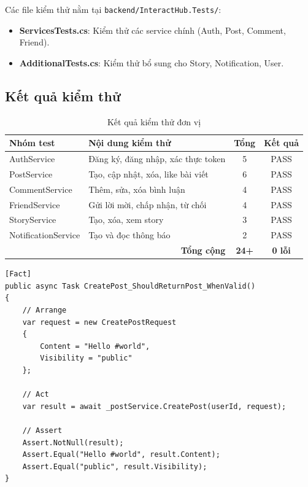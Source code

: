 \documentclass[a4paper]{article}
\begin{document}
Các file kiểm thử nằm tại \texttt{backend/InteractHub.Tests/}:

\begin{itemize}
    \item \textbf{ServicesTests.cs}: Kiểm thử các service chính (Auth, Post, Comment, Friend).
    \item \textbf{AdditionalTests.cs}: Kiểm thử bổ sung cho Story, Notification, User.
\end{itemize}

\subsection{Kết quả kiểm thử}

\begin{table}[h!]
\centering
\caption{Kết quả kiểm thử đơn vị}
\begin{tabularx}{\textwidth}{|l|X|c|c|}
\hline
\textbf{Nhóm test} & \textbf{Nội dung kiểm thử} & \textbf{Tổng} & \textbf{Kết quả} \\
\hline
AuthService & Đăng ký, đăng nhập, xác thực token & 5 & \textcolor{dkgreen}{PASS} \\
\hline
PostService & Tạo, cập nhật, xóa, like bài viết & 6 & \textcolor{dkgreen}{PASS} \\
\hline
CommentService & Thêm, sửa, xóa bình luận & 4 & \textcolor{dkgreen}{PASS} \\
\hline
FriendService & Gửi lời mời, chấp nhận, từ chối & 4 & \textcolor{dkgreen}{PASS} \\
\hline
StoryService & Tạo, xóa, xem story & 3 & \textcolor{dkgreen}{PASS} \\
\hline
NotificationService & Tạo và đọc thông báo & 2 & \textcolor{dkgreen}{PASS} \\
\hline
\multicolumn{2}{|r|}{\textbf{Tổng cộng}} & \textbf{24+} & \textcolor{dkgreen}{\textbf{0 lỗi}} \\
\hline
\end{tabularx}
\end{table}

\begin{mdframed}[hidealllines=true,backgroundcolor=lightgreen]
\begin{lstlisting}[language=CSharp, caption=Ví dụ unit test cho PostService]
[Fact]
public async Task CreatePost_ShouldReturnPost_WhenValid()
{
    // Arrange
    var request = new CreatePostRequest
    {
        Content = "Hello #world",
        Visibility = "public"
    };

    // Act
    var result = await _postService.CreatePost(userId, request);

    // Assert
    Assert.NotNull(result);
    Assert.Equal("Hello #world", result.Content);
    Assert.Equal("public", result.Visibility);
}
\end{lstlisting}
\end{mdframed}
\end{document}
